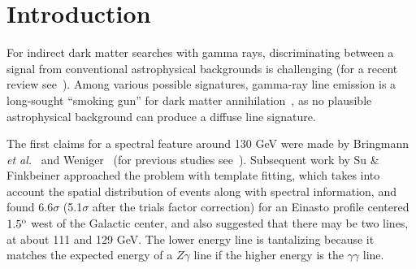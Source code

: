 \documentclass[aps,prd,superscriptaddress,nofootinbib,fixlfloat, 12pt]{revtex4-1}
\newcommand{\Fermi}{{\slshape Fermi}}
\newcommand{\degree}{^{\rm o}}
\begin{document}

\maketitle



\section{Introduction}
For indirect dark matter searches with gamma rays, discriminating between a
signal from conventional astrophysical backgrounds is challenging (for a
recent review see~\cite{Bringmann:2012ez}).  Among various possible
signatures, gamma-ray line emission is a long-sought ``smoking gun'' for dark
matter annihilation~\cite{Bergstrom:1988fp}, as no plausible astrophysical
background can produce a diffuse line signature.

 
The first claims for a spectral feature around 130 GeV were made by Bringmann
\textit{et al.}~\citep{Bringmann:2012} and Weniger~\citep{Weniger:2012} (for
previous studies see~\cite{Pullen:2006sy, Abdo:2010nc, Vertongen:2011mu,
Ackermann:2012qk}). Subsequent work by Su \& Finkbeiner approached the problem
with template fitting, which takes into account the spatial distribution of
events along with spectral information, and found 6.6$\sigma$ (5.1$\sigma$
after the trials factor correction) for an Einasto profile centered
$1.5\degree$ west of the Galactic center, and also suggested that there may
be two lines, at about 111 and 129 GeV. The lower energy line is
tantalizing because it matches the expected energy of a $Z\gamma$ line if
the higher energy is the $\gamma\gamma$ line.  

 
\end{document}
